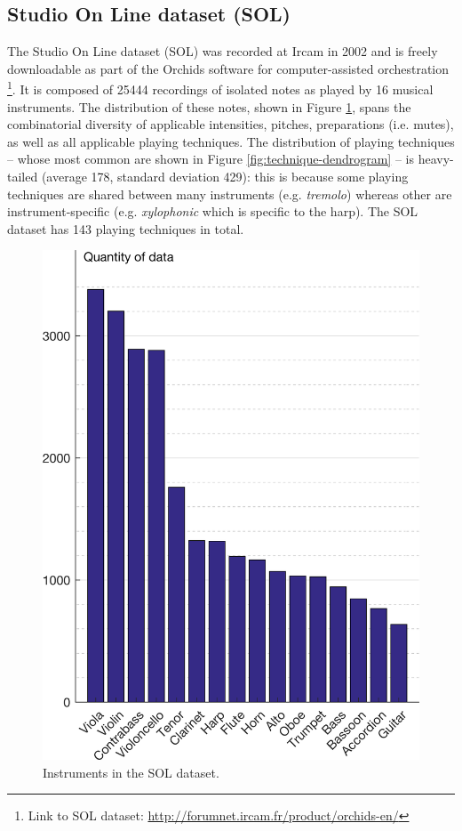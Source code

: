 \documentclass{article}
\makeatletter
\newcommand*{\eg}{e.g.\@\xspace}
\newcommand*{\ie}{i.e.\@\xspace}
\makeatother
\begin{document}
\subsection{Studio On Line dataset (SOL)}

The Studio On Line dataset (SOL) was recorded at Ircam in 2002 and is freely downloadable as part of the Orchids software for computer-assisted orchestration \footnote{Link to SOL dataset: \url{http://forumnet.ircam.fr/product/orchids-en/}}.
It is composed of 25444 recordings of isolated notes as played by 16 musical instruments.
The distribution of these notes, shown in Figure \ref{fig:instrument-histogram}, spans the combinatorial diversity of applicable intensities, pitches, preparations (\ie{} mutes), as well as all applicable playing techniques.
The distribution of playing techniques -- whose most common are shown in Figure \ref{fig:technique-dendrogram} -- is heavy-tailed (average 178, standard deviation 429): this is because some playing techniques are shared between many instruments (\eg{} \textit{tremolo}) whereas other are instrument-specific (\eg{} \textit{xylophonic} which is specific to the harp).
The SOL dataset has 143 playing techniques in total.

\begin{figure}[t!]
\centering
\includegraphics[width=\linewidth]{./figs/histogram/histogram_instruments.png}
\caption{Instruments in the SOL dataset.}
\label{fig:instrument-histogram}
\end{figure}
\end{document}
